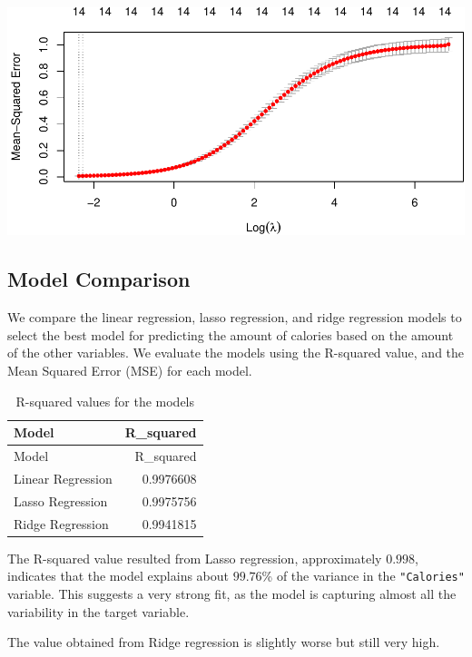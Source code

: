\documentclass[
]{article}
\begin{document}
\begin{center}\includegraphics{Statistical_Learning_Final_Report_files/figure-latex/ridge_regression-1} \end{center}

\subsection{Model Comparison}\label{model-comparison}

We compare the linear regression, lasso regression, and ridge regression
models to select the best model for predicting the amount of calories
based on the amount of the other variables. We evaluate the models using
the R-squared value, and the Mean Squared Error (MSE) for each model.

\begin{longtable}[]{@{}lr@{}}
\caption{R-squared values for the models}\tabularnewline
\toprule\noalign{}
Model & R\_squared \\
\midrule\noalign{}
\endfirsthead
\toprule\noalign{}
Model & R\_squared \\
\midrule\noalign{}
\endhead
\bottomrule\noalign{}
\endlastfoot
Linear Regression & 0.9976608 \\
Lasso Regression & 0.9975756 \\
Ridge Regression & 0.9941815 \\
\end{longtable}

The R-squared value resulted from Lasso regression, approximately
\(0.998\), indicates that the model explains about \(99.76\)\% of the
variance in the \texttt{"Calories"} variable. This suggests a very
strong fit, as the model is capturing almost all the variability in the
target variable.

The value obtained from Ridge regression is slightly worse but still
very high.
\end{document}
